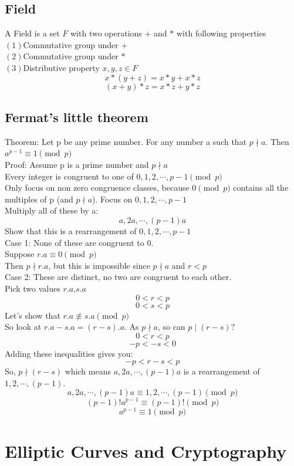 \documentclass[12pt,a4paper]{report}
\begin{document}
\section{Field}
A Field is a set $F$ with two operations $+$ and $*$ with following properties \\
$(1)$Commutative group under $+$\\
$(2)$Commutative group under $*$\\
$(3)$Distributive property $x,y,z \in F$
$$x*(y+z)=x*y+x*z$$ $$(x+y)*z=x*z+y*z$$
\section{Fermat’s little theorem}
Theorem: Let p be any prime number. For any number a such that $p\nmid a$. Then  
$a^{p-1}\equiv 1\pmod p$\\
Proof: Assume p is a prime number and $p \nmid a$ \\
Every integer is congruent to one of $0,1,2,\cdots,p-1\pmod p$\\
Only focus on non zero congruence classes, because $0 \pmod p$ contains all the multiples of p (and $p \nmid a$).
Focus on $0,1,2,\cdots,p-1$\\
Multiply all of these by a:
$$a,2a,\cdots,(p-1)a$$
Show that this is a rearrangement of $0,1,2,\cdots,p-1$\\
Case 1: None of these are congruent to 0.\\
Suppose $r.a\equiv 0 \pmod p$\\
Then $p\nmid r.a$, but this is impossible since $p\nmid a$ and $r<p$\\
Case 2: These are distinct, no two are congruent to each other.\\
Pick two values $r.a$,$s.a$\\
$$0<r<p$$
$$0<s<p$$
Let's show that $r.a \not\equiv s.a \pmod p$\\
So look at $r.a-s.a=(r-s).a$. As $p\nmid a$, so can $p \mid (r-s)?$\\
$$0<r<p$$
$$-p<-s<0$$
Adding these inequalities gives you:
$$-p<r-s<p$$ 
So, $p\nmid(r-s)$ which means $a,2a,\cdots,(p-1)a$ is a rearrangement of\\ $1,2,\cdots,(p-1).$
$$a,2a,\cdots,(p-1)a\equiv 1,2,\cdots,(p-1) \pmod p$$
$$(p-1)!a^{p-1}\equiv (p-1)! \pmod p$$
$$a^{p-1}\equiv 1 \pmod p$$
		
	
	
\cleardoublepage	

\chapter{Elliptic Curves and Cryptography}
\end{document}
